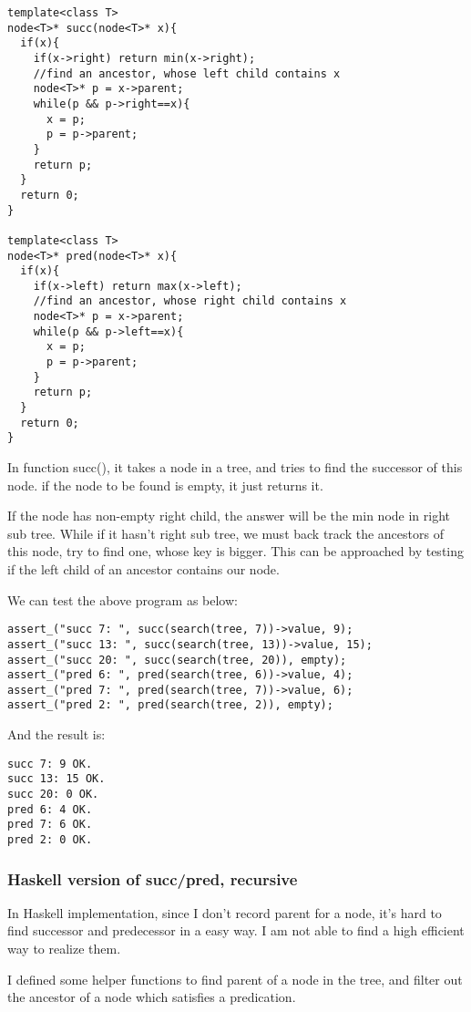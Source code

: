 \documentclass{article}
\begin{document}
\lstset{language=C++}
\begin{lstlisting}
template<class T>
node<T>* succ(node<T>* x){
  if(x){
    if(x->right) return min(x->right);
    //find an ancestor, whose left child contains x
    node<T>* p = x->parent;
    while(p && p->right==x){
      x = p;
      p = p->parent;
    }
    return p;
  }
  return 0;
}

template<class T>
node<T>* pred(node<T>* x){
  if(x){
    if(x->left) return max(x->left);
    //find an ancestor, whose right child contains x
    node<T>* p = x->parent;
    while(p && p->left==x){
      x = p;
      p = p->parent;
    }
    return p;
  }
  return 0;
}
\end{lstlisting}

In function succ(), it takes a node in a tree, and tries to find the successor
of this node. if the node to be found is empty, it just returns it.

If the node has non-empty right child, the answer will be the min node in right
sub tree. While if it hasn't right sub tree, we must back track the ancestors 
of this node, try to find one, whose key is bigger. This can be approached 
by testing if the left child of an ancestor contains our node.

We can test the above program as below:

\begin{lstlisting}
assert_("succ 7: ", succ(search(tree, 7))->value, 9);
assert_("succ 13: ", succ(search(tree, 13))->value, 15);
assert_("succ 20: ", succ(search(tree, 20)), empty);
assert_("pred 6: ", pred(search(tree, 6))->value, 4);
assert_("pred 7: ", pred(search(tree, 7))->value, 6);
assert_("pred 2: ", pred(search(tree, 2)), empty);
\end{lstlisting}

And the result is:
\begin{verbatim}
succ 7: 9 OK.
succ 13: 15 OK.
succ 20: 0 OK.
pred 6: 4 OK.
pred 7: 6 OK.
pred 2: 0 OK.
\end{verbatim}

\subsubsection*{Haskell version of succ/pred, recursive}

In Haskell implementation, since I don't record parent for a node, it's hard
to find successor and predecessor in a easy way. I am not able to find a high
efficient way to realize them.

I defined some helper functions to find parent of a node in the tree, and filter
out the ancestor of a node which satisfies a predication. 
\end{document}
